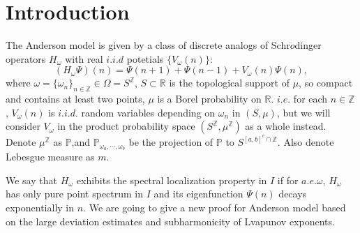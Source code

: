 \section{Introduction}
The Anderson model is given by a class of discrete analogs of Schr$\ddot{o}$dinger operators $H_{\omega}$ with real $i.i.d$ potetials $\{V_{\omega}(n)\}$:
\begin{equation}
  (H_{\omega}\Psi)(n)=\Psi(n+1)+\Psi(n-1)+V_{\omega}(n)\Psi(n),
\end{equation}
where $\omega=\{\omega_n\}_{n\in\mathbb{Z}}\in\Omega=S^{\mathbb{Z}}$, $S\subset\mathbb{R}$ is the topological support of $\mu$, so compact and contains at least two points, $\mu$ is a Borel probability on $\mathbb{R}$. $i.e.$ for each $n\in\mathbb{Z}$, $V_{\omega} (n)$ is $i.i.d.$ random variables depending on $\omega_n$ in $(S,\mu) $, but we will consider $V_\omega$ in the product probability space $ (S^{\mathbb{Z}},\mu^{\mathbb{Z}})$ as a whole instead. Denote $\mu^{\mathbb{Z}}$ as $\mathbb{P}$,and $\mathbb{P}_{\omega_a,\cdots,\omega_b}$ be the projection of $\mathbb{P}$ to $S^{[a,b]^c\cap \mathbb{Z}}$.  Also denote Lebesgue measure as $m$.

We say that $H_\omega$ exhibits the spectral localization property in $I$ if for $a.e.\omega$, $H_\omega$ has only pure point spectrum in $I$ and its eigenfunction $\Psi(n)$ decays exponentially in $n$. We are going to give a new proof for Anderson model based on the large deviation estimates and subharmonicity of Lvapunov exponents.
